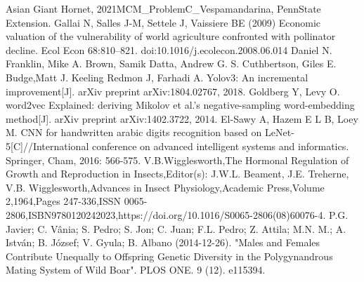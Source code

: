 \documentclass{mcmthesis}
\begin{document}
\begin{thebibliography}{3}
Asian Giant Hornet, 2021MCM\_ProblemC\_Vespamandarina, PennState Extension.
Gallai N, Salles J-M, Settele J, Vaissiere BE (2009) Economic valuation of the vulnerability of world agriculture confronted with pollinator decline. Ecol Econ 68:810–821. doi:10.1016/j.ecolecon.2008.06.014
Daniel N. Franklin, Mike A. Brown, Samik Datta, Andrew G. S. Cuthbertson, Giles E. Budge,Matt J. Keeling
Redmon J, Farhadi A. Yolov3: An incremental improvement[J]. arXiv preprint arXiv:1804.02767, 2018.
Goldberg Y, Levy O. word2vec Explained: deriving Mikolov et al.'s negative-sampling word-embedding method[J]. arXiv preprint arXiv:1402.3722, 2014.
El-Sawy A, Hazem E L B, Loey M. CNN for handwritten arabic digits recognition based on LeNet-5[C]//International conference on advanced intelligent systems and informatics. Springer, Cham, 2016: 566-575.
 V.B.Wigglesworth,The Hormonal Regulation of Growth and Reproduction in Insects,Editor(s): J.W.L. Beament, J.E. Treherne, V.B. Wigglesworth,Advances in Insect Physiology,Academic Press,Volume 2,1964,Pages 247-336,ISSN 0065-2806,ISBN9780120242023,https://doi.org/10.1016/S0065-2806(08)60076-4.
 P.G. Javier; C. Vânia; S. Pedro; S. Jon; C. Juan; F.L. Pedro; Z. Attila; M.N. M.; A. István; B. József; V. Gyula; B. Albano (2014-12-26). "Males and Females Contribute Unequally to Offspring Genetic Diversity in the Polygynandrous Mating System of Wild Boar". PLOS ONE. 9 (12). e115394. 
\end{thebibliography}
\newpage
\end{document}
